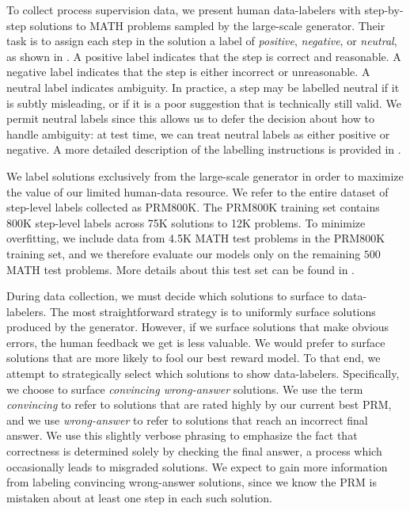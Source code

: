 \documentclass{article}
\begin{document}
To collect process supervision data, we present human data-labelers with step-by-step solutions to MATH problems sampled by the large-scale generator. Their task is to assign each step in the solution a label of \textit{positive}, \textit{negative}, or \textit{neutral}, as shown in . A positive label indicates that the step is correct and reasonable. A negative label indicates that the step is either incorrect or unreasonable. A neutral label indicates ambiguity. In practice, a step may be labelled neutral if it is subtly misleading, or if it is a poor suggestion that is technically still valid. We permit neutral labels since this allows us to defer the decision about how to handle ambiguity: at test time, we can treat neutral labels as either positive or negative. A more detailed description of the labelling instructions is provided in .

We label solutions exclusively from the large-scale generator in order to maximize the value of our limited human-data resource. We refer to the entire dataset of step-level labels collected as PRM800K. The PRM800K training set contains 800K step-level labels across 75K solutions to 12K problems. To minimize overfitting, we include data from 4.5K MATH test problems in the PRM800K training set, and we therefore evaluate our models only on the remaining $500$ MATH test problems. More details about this test set can be found in .

During data collection, we must decide which solutions to surface to data-labelers. The most straightforward strategy is to uniformly surface solutions produced by the generator. However, if we surface solutions that make obvious errors, the human feedback we get is less valuable. We would prefer to surface solutions that are more likely to fool our best reward model. To that end, we attempt to strategically select which solutions to show data-labelers. Specifically, we choose to surface \textit{convincing wrong-answer} solutions. We use the term \textit{convincing} to refer to solutions that are rated highly by our current best PRM, and we use \textit{wrong-answer} to refer to solutions that reach an incorrect final answer. We use this slightly verbose phrasing to emphasize the fact that correctness is determined solely by checking the final answer, a process which occasionally leads to misgraded solutions. We expect to gain more information from labeling convincing wrong-answer solutions, since we know the PRM is mistaken about at least one step in each such solution.
\end{document}

